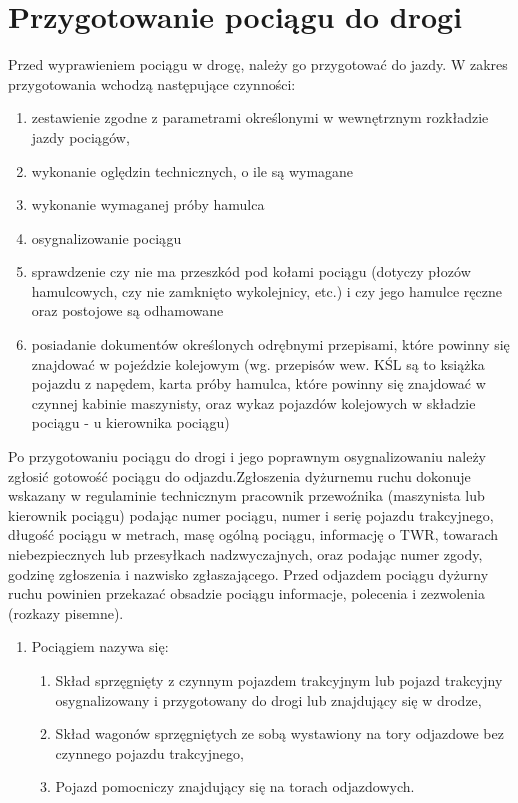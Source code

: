 \section{Przygotowanie pociągu do drogi}

Przed wyprawieniem pociągu w drogę, należy go przygotować do jazdy. W zakres przygotowania wchodzą następujące czynności:

\begin{enumerate}
\item zestawienie zgodne z parametrami określonymi w wewnętrznym rozkładzie jazdy pociągów,
\item wykonanie oględzin technicznych, o ile są wymagane
\item wykonanie wymaganej próby hamulca
\item osygnalizowanie pociągu
\item sprawdzenie czy nie ma przeszkód pod kołami pociągu (dotyczy płozów hamulcowych, czy nie zamknięto wykolejnicy,
etc.) i czy jego hamulce ręczne oraz postojowe są odhamowane
\item posiadanie dokumentów określonych odrębnymi przepisami, które powinny się znajdować w pojeździe kolejowym (wg. przepisów wew. KŚL są to książka pojazdu z napędem, karta próby hamulca, które powinny się znajdować w czynnej kabinie maszynisty, oraz wykaz pojazdów kolejowych w składzie pociągu - u kierownika pociągu)
\end{enumerate}
Po przygotowaniu pociągu do drogi i jego poprawnym osygnalizowaniu należy zgłosić gotowość pociągu do odjazdu.Zgłoszenia dyżurnemu ruchu dokonuje wskazany w regulaminie technicznym pracownik przewoźnika (maszynista lub kierownik pociągu) podając numer pociągu, numer i serię pojazdu trakcyjnego, długość pociągu w metrach, masę ogólną pociągu, informację o TWR, towarach niebezpiecznych lub przesyłkach nadzwyczajnych, oraz podając numer zgody, godzinę zgłoszenia i nazwisko zgłaszającego. Przed odjazdem pociągu dyżurny ruchu powinien przekazać obsadzie pociągu informacje, polecenia i zezwolenia (rozkazy pisemne).

\begin{tcolorbox}
	\begin{enumerate}
		\item Pociągiem nazywa się:
		\begin{enumerate}
			\item Skład sprzęgnięty z czynnym pojazdem trakcyjnym lub pojazd trakcyjny osygnalizowany i przygotowany do drogi lub znajdujący się w drodze,
			\item Skład wagonów sprzęgniętych ze sobą wystawiony na tory odjazdowe bez czynnego pojazdu trakcyjnego,
			\item Pojazd pomocniczy znajdujący się na torach odjazdowych.
		\end{enumerate}
	\end{enumerate}
\end{tcolorbox}

